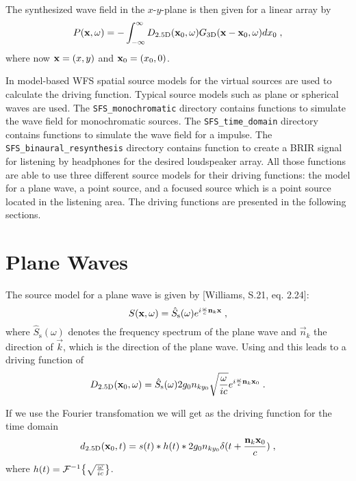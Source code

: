 \documentclass{article}
\begin{document}
The synthesized wave field in the $x$-$y$-plane is then given for a linear array
by
\begin{equation}
    P( \mathbf{x} ,\omega) = - \int^{\infty}_{-\infty} D_{\text{2.5D}}( \mathbf{x} _0,\omega)
    G_{\text{3D}}(  \mathbf{x} - \mathbf{x} _0 ,\omega) dx_0
    \;,
    \label{eq:P}
\end{equation}
where now $ \mathbf{x}  = (x,y)$ and $ \mathbf{x} _0 = (x_0,0)$.

In model-based WFS spatial
source models for the virtual sources are used to calculate the driving
function. Typical source models such as plane or spherical waves are used. The 
\texttt{SFS\_monochromatic} directory contains functions to simulate the wave
field
for monochromatic sources. The \texttt{SFS\_time\_domain} directory contains
functions to simulate the wave field for a impulse. The
\texttt{SFS\_binaural\_resynthesis} directory contains function to create a BRIR
signal for listening by headphones for the desired loudspeaker array.
All those functions are able to use three different source models for their
driving functions: the model for
a plane wave, a point source, and a focused source which is a point source
located in the listening area.
The driving functions are presented in the following sections.

\section{Plane Waves}
The source model for a plane wave is given by [Williams, S.21, eq. 2.24]:
\begin{equation} 
    S( \mathbf{x} ,\omega) = 
    \hat{S}_\text{s}(\omega)
    e^{i \frac{\omega}{c}   \mathbf{n} _k  \mathbf{x} }
    \;,
\end{equation}
where $\hat{S}_\text{s}(\omega)$ denotes the frequency spectrum of the plane
wave and $\vec{n}_k$ the direction of $\vec{k}$, which is the direction of the
plane wave.
Using  and  this leads to a driving function of
\begin{equation}
    D_{\text{2.5D}}( \mathbf{x} _0,\omega) = \hat{S}_\text{s}(\omega)
    2 g_0 n_{ky_0} \sqrt{\frac{\omega}{ic}}
    e^{i \frac{\omega}{c}   \mathbf{n} _k  \mathbf{x} _0}
    \;.
    \label{Dpw}
\end{equation}

If we use the Fourier transfomation we will get as the driving function for the
time domain
\begin{equation}
    d_{\text{2.5D}}( \mathbf{x} _0,t) = s(t) * h(t) * 2 g_0 n_{ky_0} \delta(t +
    \frac{ \mathbf{n} _k  \mathbf{x} _0}{c})
    \;,
    \label{dpw}
\end{equation}
where $h(t) = \mathcal{F}^{-1}{\left\{ \sqrt{\frac{\omega}{ic}} \right\}}$.
\end{document}
